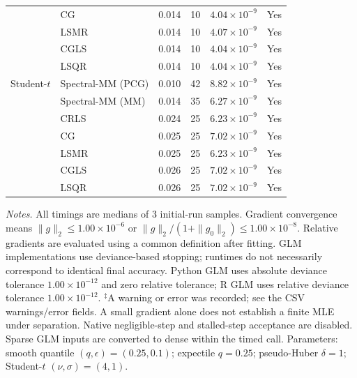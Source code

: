 \begin{longtable}{llrrrc}
 & CG & 0.014 & 10 & $4.04\times10^{-9}$ & Yes \\
 & LSMR & 0.014 & 10 & $4.07\times10^{-9}$ & Yes \\
 & CGLS & 0.014 & 10 & $4.04\times10^{-9}$ & Yes \\
 & LSQR & 0.014 & 10 & $4.04\times10^{-9}$ & Yes \\
\midrule
Student-$t$ & Spectral-MM (PCG) & 0.010 & 42 & $8.82\times10^{-9}$ & Yes \\
 & Spectral-MM (MM) & 0.014 & 35 & $6.27\times10^{-9}$ & Yes \\
 & CRLS & 0.024 & 25 & $6.23\times10^{-9}$ & Yes \\
 & CG & 0.025 & 25 & $7.02\times10^{-9}$ & Yes \\
 & LSMR & 0.025 & 25 & $6.23\times10^{-9}$ & Yes \\
 & CGLS & 0.026 & 25 & $7.02\times10^{-9}$ & Yes \\
 & LSQR & 0.026 & 25 & $7.02\times10^{-9}$ & Yes \\
\end{longtable}
\noindent\textit{Notes.} All timings are medians of 3 initial-run samples.
Gradient convergence means $\|g\|_2\leq 1.00\times10^{-6}$ or $\|g\|_2/(1+\|g_0\|_2)\leq 1.00\times10^{-8}$.
Relative gradients are evaluated using a common definition after fitting. GLM implementations use deviance-based stopping; runtimes do not necessarily correspond to identical final accuracy.
Python GLM uses absolute deviance tolerance $1.00\times10^{-12}$ and zero relative tolerance; R GLM uses relative deviance tolerance $1.00\times10^{-12}$.
$^{\ddagger}$A warning or error was recorded; see the CSV warnings/error fields. A small gradient alone does not establish a finite MLE under separation.
Native negligible-step and stalled-step acceptance are disabled.
Sparse GLM inputs are converted to dense within the timed call.
Parameters: smooth quantile $(q,\epsilon)=(0.25,0.1)$; expectile $q=0.25$; pseudo-Huber $\delta=1$; Student-$t$ $(\nu,\sigma)=(4,1)$.
\par
\endgroup
